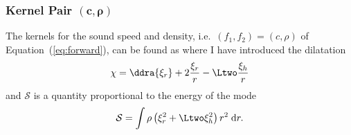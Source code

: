 \subsubsection*{Kernel Pair \texorpdfstring{$\mathbf{(c, \rho)}$}{(c,rho)}}
\noindent
The kernels for the sound speed and density, i.e.\ ${(f_1, f_2) = (c, \rho)}$ of Equation~(\ref{eq:forward}), can be found as \citep[\emph{cf.}][]{GoughThompson1991}
\lr{\begin{align}
    \omega^2 \mathcal{S} \Kcr ={} & r^2 \rho c^2 \chi^2 
\\  \omega^2 \mathcal{S} \Krc ={} & 
    - \half \left( 
        \xi_r^2 + L^2 \xi_h^2 
    \right) 
    r^2 \rho \omega^2 
    \\& + \frac{1}{2} \rho c^2 \chi^2 r^2 
    - G m \rho \left( 
        \chi 
        + 
        \half \xi_r \ddra{\ln \rho} 
    \right) \xi_r
    \notag\\& - 4\pi G \rho r^2 \int_{r}^R \left( 
        \chi 
        + 
        \half \xi_r \frac{\text{d} \ln \rho}{\text{d} s} %
    \right) \xi_r \rho \; \text{d}s
    \notag\\& + G m \rho \; \xi_r \ddra{\xi_r} 
    + \half G \left(
        m \ddra{\rho} 
        + 
        4\pi r^2 \rho^2 
    \right) \xi_r^2
    \notag\\& - \frac{4 \pi G}{2\ell + 1} \rho \Bigg[ 
        (\ell+1) r^{-\ell} \left(
            \xi_r 
            - 
            \ell \xi_h
        \right) \int_{0}^r \left(
            \rho \chi 
            + 
            \xi_r \ddsa{\rho} 
        \right) s^{\ell+2} \; \text{d}s 
        \notag\\&\hphantom{- \frac{4 \pi G}{2\ell + 1} \rho \Bigg[}
        - \ell r^{\ell+1} \left( 
            \xi_r 
            + 
            \left( 
                \ell+1
            \right) \xi_h 
        \right) \int_r^R \left( 
            \rho \chi 
            + 
            \xi_r \ddsa{\rho} 
        \right) s^{-(\ell-1)} \; \text{d}s 
    \Bigg] \notag
\end{align}}
where %
I have introduced the dilatation
\begin{equation}
    \chi = \ddra{\xi_r} + 2\frac{\xi_r}{r} - \Ltwo \frac{\xi_h}{r}
\end{equation}
and $\mathcal{S}$ is a quantity proportional to the energy of the mode
\begin{equation}
    \mathcal{S} = \int \rho \left( \xi_r^2 + \Ltwo \xi_h^2 \right) r^2 \; \text{d}r. 
\end{equation}



